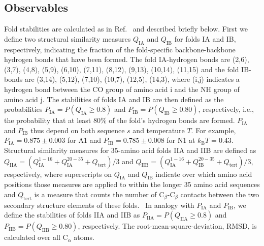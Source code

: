 \documentclass[
aip,
rsi,%
amsmath,amssymb,
reprint,%
]{revtex4-1}
\newcommand	 {\sbar}	{{s}}
\newcommand	 {\kb}		{{k_\mathrm{B}}}
\newcommand {\QIA}	{{Q_\mathrm{IA}}}
\newcommand {\QIB}	{{Q_\mathrm{IB}}}
\newcommand {\QIIA}	{{Q_\mathrm{IIA}}}
\newcommand {\QIIB}	{{Q_\mathrm{IIB}}}
\newcommand {\PIA}    	{{P_\mathrm{IA}}}
\newcommand {\PIB}    	{{P_\mathrm{IB}}}
\newcommand {\PIIA}    	{{P_\mathrm{IIA}}}
\newcommand {\PIIB}    	{{P_\mathrm{IIB}}}
\begin{document}
\subsection{Observables}
\noindent
Fold stabilities are calculated as in Ref.~ and described briefly below. First we define two structural similarity measures $\QIA$ and $\QIB$ for folds IA and IB, respectively, indicating the fraction of the fold-specific backbone-backbone hydrogen bonds that have been formed. The fold IA-hydrogen bonds are (2,6), (3,7), (4,8), (5,9), (6,10), (7,11), (8,12), (9,13), (10,14), (11,15) and the fold IB-bonds are (3,14), (5,12), (7,10), (10,7), (12,5), (14,3), where (i,j) indicates a hydrogen bond between the CO group of amino acid i and the NH group of amino acid j. The  stabilities of folds IA and IB are then defined as the probabilities $\PIA = P(\QIA\ge0.8)$ and $\PIB = P(\QIB\ge0.80)$, respectively, i.e., the probability that at least 80\% of the fold's hydrogen bonds are formed. $\PIA$ and $\PIB$ thus depend on both sequence $\sbar$ and temperature $T$. For example, $\PIA=0.875\pm 0.003$ for A1 and $\PIB=0.785\pm0.008$ for N1 at $\kb T = 0.43$. Structural similarity measures for 35-amino acid folds IIA and IIB are defined as $\QIIA = ( Q_\mathrm{IA}^\mathrm{1-16} + Q_\mathrm{IA}^\mathrm{20-35} + Q_\mathrm{tert} ) / 3$ and $\QIIB = ( Q_\mathrm{IA}^\mathrm{1-16} + Q_\mathrm{IB}^\mathrm{20-35} + Q_\mathrm{tert} ) / 3$, respectively, where superscripts on $\QIA$ and $\QIB$ indicate over which amino acid positions those measures are applied to within the longer 35 amino acid sequences and $Q_\mathrm{tert}$ is a measure that counts the number of $\mathrm{C}_\beta$-$\mathrm{C}_\beta$ contacts between the two secondary structure elements of these folds.~\cite{Holzgrafe2015} In analogy with $\PIA$ and $\PIB$, we define the stabilities of folds IIA and IIB as $\PIIA = P(\QIIA\ge0.8)$ and $\PIIB = P(\QIIB\ge0.80)$, respectively. The root-mean-square-deviation, RMSD, is calculated over all $\mathrm{C}_\alpha$ atoms.
\end{document}
